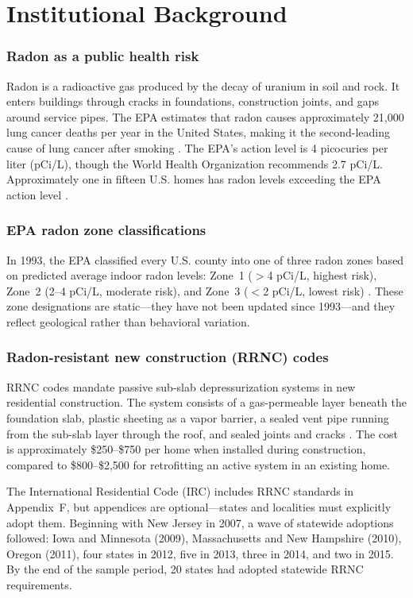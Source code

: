 \documentclass[12pt]{article}
\begin{document}
\section{Institutional Background}

\subsubsection*{Radon as a public health risk} Radon is a radioactive gas produced by the decay of uranium in soil and rock. It enters buildings through cracks in foundations, construction joints, and gaps around service pipes. The EPA estimates that radon causes approximately 21,000 lung cancer deaths per year in the United States, making it the second-leading cause of lung cancer after smoking \citep{epa2003assessment}. The EPA's action level is 4 picocuries per liter (pCi/L), though the World Health Organization recommends 2.7 pCi/L. Approximately one in fifteen U.S. homes has radon levels exceeding the EPA action level \citep{epa2016guide}.

\subsubsection*{EPA radon zone classifications} In 1993, the EPA classified every U.S. county into one of three radon zones based on predicted average indoor radon levels: Zone~1 ($>$4 pCi/L, highest risk), Zone~2 (2--4 pCi/L, moderate risk), and Zone~3 ($<$2 pCi/L, lowest risk) \citep{epa1993zones}. These zone designations are static---they have not been updated since 1993---and they reflect geological rather than behavioral variation.

\subsubsection*{Radon-resistant new construction (RRNC) codes} RRNC codes mandate passive sub-slab depressurization systems in new residential construction. The system consists of a gas-permeable layer beneath the foundation slab, plastic sheeting as a vapor barrier, a sealed vent pipe running from the sub-slab layer through the roof, and sealed joints and cracks \citep{aarst2020standard}. The cost is approximately \$250--\$750 per home when installed during construction, compared to \$800--\$2,500 for retrofitting an active system in an existing home.

The International Residential Code (IRC) includes RRNC standards in Appendix~F, but appendices are optional---states and localities must explicitly adopt them. Beginning with New Jersey in 2007, a wave of statewide adoptions followed: Iowa and Minnesota (2009), Massachusetts and New Hampshire (2010), Oregon (2011), four states in 2012, five in 2013, three in 2014, and two in 2015. By the end of the sample period, 20 states had adopted statewide RRNC requirements.
\end{document}
